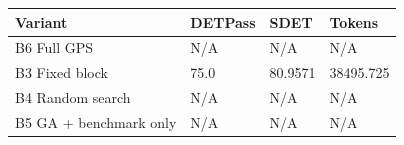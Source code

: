 \begin{tabular}{llll}
\toprule
Variant & DETPass & SDET & Tokens \\
\midrule
B6 Full GPS & N/A & N/A & N/A \\
B3 Fixed block & 75.0 & 80.9571 & 38495.725 \\
B4 Random search & N/A & N/A & N/A \\
B5 GA + benchmark only & N/A & N/A & N/A \\
\bottomrule
\end{tabular}
